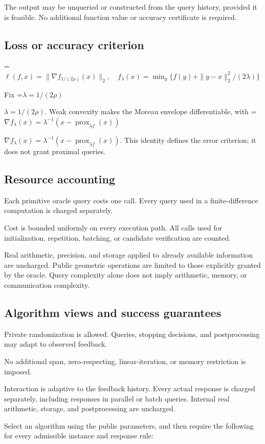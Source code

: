 \documentclass[10pt,a4paper]{article}
\newcommand{\AtlasMath}[1]{\par\begingroup\centering\setbox0=\hbox{$\displaystyle #1$}\ifdim\wd0>1.4\linewidth\typeout{ATLAS WIDE FORMULA: \the\wd0}\fi\ifdim\wd0>\linewidth\resizebox{\linewidth}{!}{\box0}\else\box0\fi\par\endgroup}
\newcommand{\AtlasInlineMath}[1]{\begingroup\setbox0=\hbox{$#1$}\ifdim\wd0>.4\linewidth\endgroup\AtlasMath{#1}\else\endgroup$#1$\fi}
\begin{document}
The output may be unqueried or constructed from the query history, provided it is feasible. No additional function value or accuracy certificate is required.

\subsection{Loss or accuracy criterion}

\AtlasMath{\ell(f,x)=\|\nabla f_{1/(2\rho)}(x)\|_2,\quad f_\lambda(x)=\min_y\{f(y)+\|y-x\|_2^2/(2\lambda)\}}


Fix \AtlasInlineMath{\lambda=1/(2\rho)}. Weak convexity makes the Moreau envelope differentiable, with \AtlasInlineMath{\nabla f_\lambda(x)=\lambda^{-1}(x-\operatorname{prox}_{\lambda f}(x))}. This identity defines the error criterion; it does not grant proximal queries.

\subsection{Resource accounting}
Each primitive oracle query costs one call. Every query used in a finite-difference computation is charged separately.

Cost is bounded uniformly on every execution path. All calls used for initialization, repetition, batching, or candidate verification are counted.

Real arithmetic, precision, and storage applied to already available information are uncharged. Public geometric operations are limited to those explicitly granted by the oracle. Query complexity alone does not imply arithmetic, memory, or communication complexity.

\subsection{Algorithm views and success guarantees}
Private randomization is allowed. Queries, stopping decisions, and postprocessing may adapt to observed feedback.

No additional span, zero-respecting, linear-iteration, or memory restriction is imposed.

Interaction is adaptive to the feedback history. Every actual response is charged separately, including responses in parallel or batch queries. Internal real arithmetic, storage, and postprocessing are uncharged.

Select an algorithm using the public parameters, and then require the following for every admissible instance and response rule:
\end{document}
